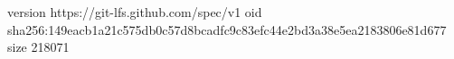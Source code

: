 version https://git-lfs.github.com/spec/v1
oid sha256:149eacb1a21c575db0c57d8bcadfc9c83efc44e2bd3a38e5ea2183806e81d677
size 218071
